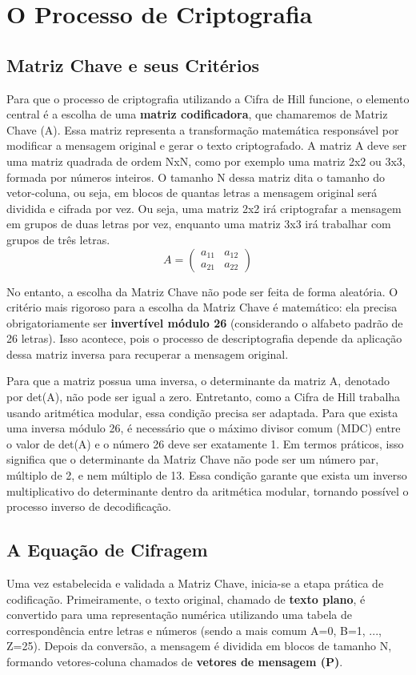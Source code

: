 \documentclass[a4paper,12pt,twocolumn]{article}
\begin{document}
\section{O Processo de Criptografia}
\subsection{Matriz Chave e seus Critérios}
Para que o processo de criptografia utilizando a Cifra de Hill funcione, o elemento central é a escolha de uma \textbf{matriz codificadora}, que chamaremos de Matriz Chave (A). Essa matriz representa a transformação matemática responsável por modificar a mensagem original e gerar o texto criptografado. A matriz A deve ser uma matriz quadrada de ordem NxN, como por exemplo uma matriz 2x2 ou 3x3, formada por números inteiros. O tamanho N dessa matriz dita o tamanho do vetor-coluna, ou seja, em blocos de quantas letras a mensagem original será dividida e cifrada por vez. Ou seja, uma matriz 2x2 irá criptografar a mensagem em grupos de duas letras por vez, enquanto uma matriz 3x3 irá trabalhar com grupos de três letras.
\begin{equation}
A = \begin{pmatrix} a_{11} & a_{12} \\ a_{21} & a_{22} \end{pmatrix}
\end{equation}

No entanto, a escolha da Matriz Chave não pode ser feita de forma aleatória. O critério mais rigoroso para a escolha da Matriz Chave é matemático: ela precisa obrigatoriamente ser \textbf{invertível módulo 26} (considerando o alfabeto padrão de 26 letras). Isso acontece, pois o processo de descriptografia depende da aplicação dessa matriz inversa para recuperar a mensagem original.

Para que a matriz possua uma inversa, o determinante da matriz A, denotado por det(A), não pode ser igual a zero. Entretanto, como a Cifra de Hill trabalha usando aritmética modular, essa condição precisa ser adaptada. Para que exista uma inversa módulo 26, é necessário que o máximo divisor comum (MDC) entre o valor de det(A) e o número 26 deve ser exatamente 1. Em termos práticos, isso significa que o determinante da Matriz Chave não pode ser um número par, múltiplo de 2, e nem múltiplo de 13. Essa condição garante que exista um inverso multiplicativo do determinante dentro da aritmética modular, tornando possível o processo inverso de decodificação.

\subsection{A Equação de Cifragem}
Uma vez estabelecida e validada a Matriz Chave, inicia-se a etapa prática de codificação. Primeiramente, o texto original, chamado de \textbf{texto plano}, é convertido para uma representação numérica utilizando uma tabela de correspondência entre letras e números (sendo a mais comum A=0, B=1, ..., Z=25). Depois da conversão, a mensagem é dividida em blocos de tamanho N, formando vetores-coluna chamados de \textbf{vetores de mensagem (P)}.
\end{document}
